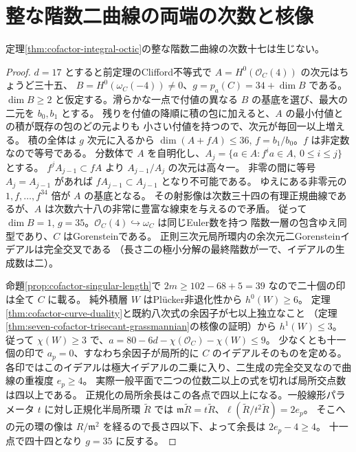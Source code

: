 \section{整な階数二曲線の両端の次数と核像}
\label{sec:cofactor-extreme-degrees}
\begin{theorem}\label{thm:cofactor-exclude-seventeen}
定理\ref{thm:cofactor-integral-octic}の整な階数二曲線の次数十七は生じない。
\end{theorem}
\begin{proof}
$d=17$ とすると前定理のClifford不等式で $A=H^0(\mathcal O_C(4))$ の次元はちょうど三十五、
$B=H^0(\omega_C(-4))\ne0$、$g=p_a(C)=34+\dim B$ である。
$\dim B\ge2$ と仮定する。滑らかな一点で付値の異なる $B$ の基底を選び、最大の二元を $b_0,b_1$ とする。
残りを付値の降順に積の包に加えると、$A$ の最小付値との積が既存の包のどの元よりも
小さい付値を持つので、次元が毎回一以上増える。
積の全体は $g$ 次元に入るから $\dim(A+fA)\le36$, $f=b_1/b_0$。$f$ は非定数なので等号である。
分数体で $A$ を自明化し、$A_j=\{a\in A:f^ia\in A,\ 0\le i\le j\}$ とする。
$f^jA_{j-1}\subset fA$ より $A_{j-1}/A_j$ の次元は高々一。
非零の間に等号 $A_j=A_{j-1}$ があれば $f A_{j-1}\subset A_{j-1}$ となり不可能である。
ゆえにある非零元の $1,f,\ldots,f^{34}$ 倍が $A$ の基底となる。
その射影像は次数三十四の有理正規曲線であるが、$A$ は次数六十八の非常に豊富な線束を与えるので矛盾。
従って $\dim B=1$, $g=35$。$\mathcal O_C(4)\hookrightarrow\omega_C$ は同じEuler数を持つ
階数一層の包含ゆえ同型であり、$C$ はGorensteinである。
正則三次元局所環内の余次元二Gorensteinイデアルは完全交叉である
（長さ二の極小分解の最終階数が一で、イデアルの生成数は二）。

命題\ref{prop:cofactor-singular-length}で $2m\ge102-68+5=39$ なので二十個の印は全て $C$ に載る。
純外積層 $W$ はPlücker非退化性から $h^0(W)\ge6$。
定理\ref{thm:cofactor-curve-duality}と既約八次式の余因子が七以上独立なこと
（定理\ref{thm:seven-cofactor-trisecant-grassmannian}の核像の証明）から $h^1(W)\le3$。
従って $\chi(W)\ge3$ で、$a=80-6d-\chi(\mathcal O_C)-\chi(W)\le9$。
少なくとも十一個の印で $a_p=0$、すなわち余因子が局所的に $C$ のイデアルそのものを定める。
各印ではこのイデアルは極大イデアルの二乗に入り、二生成の完全交叉なので曲線の重複度 $e_p\ge4$。
実際一般平面で二つの位数二以上の式を切れば局所交点数は四以上である。
正規化の局所余長はこの各点で四以上になる。一般線形パラメータ $t$ に対し正規化半局所環
$\widetilde R$ では $\mathfrak m\widetilde R=t\widetilde R$、$\ell(\widetilde R/t^2\widetilde R)=2e_p$。
そこへの元の環の像は $R/\mathfrak m^2$ を経るので長さ四以下、よって余長は $2e_p-4\ge4$。
十一点で四十四となり $g=35$ に反する。
\end{proof}

